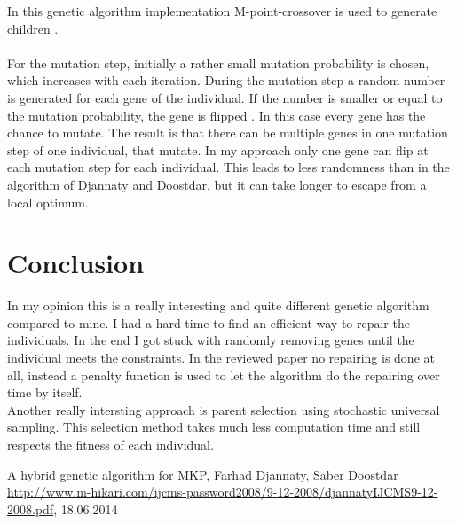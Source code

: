 \documentclass[fontsize=12pt,toc=bibliography, notitlepage]{scrreprt}
\begin{document}
In this genetic algorithm implementation M-point-crossover is used to generate children \cite[p. 7]{bib:hybrid-ga}. \\ \\
For the mutation step, initially a rather small mutation probability is chosen, which increases with each iteration. During the mutation step a random number is generated for each gene of the individual. If the number is smaller or equal to the mutation probability, the gene is flipped \cite[p. 7 - 8]{bib:hybrid-ga}. In this case every gene has the chance to mutate. The result is that there can be multiple genes in one mutation step of one individual, that mutate. In my approach only one gene can flip at each mutation step for each individual. This leads to less randomness than in the algorithm of Djannaty and Doostdar, but it can take longer to escape from a local optimum. 

\section{Conclusion}
\label{sec:rev-con}
In my opinion this is a really interesting and quite different genetic algorithm compared to mine. I had a hard time to find an efficient way to repair the individuals. In the end I got stuck with randomly removing genes until the individual meets the constraints. In the reviewed paper no repairing is done at all, instead a penalty function is used to let the algorithm do the repairing over time by itself. \\
Another really intersting approach is parent selection using stochastic universal sampling. This selection method takes much less computation time and still respects the fitness of each individual. \\

\begin{thebibliography}{999}
	\raggedright
	 A hybrid genetic algorithm for MKP, Farhad Djannaty, Saber Doostdar \url{http://www.m-hikari.com/ijcms-password2008/9-12-2008/djannatyIJCMS9-12-2008.pdf}, 18.06.2014
\end{thebibliography}

\cleardoublepage
{}
\listoffigures
\end{document}
